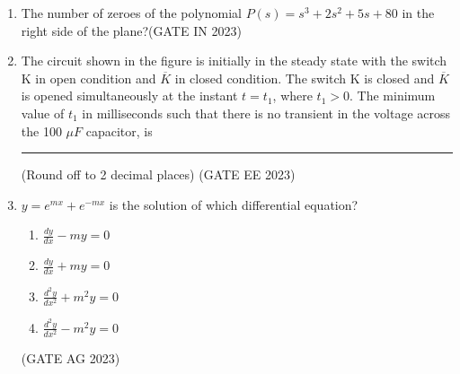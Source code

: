 \begin{enumerate}[label=\thechapter.\arabic*,ref=\thechapter.\theenumi]

\item The number of zeroes of the polynomial $P(s) = s^3+2s^2+5s+80$ in the right side of the plane?\hfill(GATE IN 2023) \\

\solution

\newpage

\item The circuit shown in the figure is initially in the steady state with the switch K in open condition and $\overline{K}$ in closed condition. The switch K is closed and $\overline{K}$ is opened simultaneously at the instant $t = t_1$, where $t_1 > 0$. The minimum value of $t_1$ in milliseconds such that there is no transient in the voltage across the 100 $\mu F$ capacitor, is \rule{1cm}{0.15mm} (Round off to 2 decimal places) \hfill (GATE EE 2023)


\newpage
\item $y=e^{mx}+e^{-mx}$ is the solution of which differential equation?
\begin{enumerate}[label=\textbf{\arabic*.}, font=\bfseries, align=left]
    \item $\frac{dy}{dx} - my = 0$ 
    \item $\frac{dy}{dx} + my = 0$ 
    \item $\frac{d^{2}y}{dx^{2}} + m^{2}y = 0$ 
    \item $\frac{d^{2}y}{dx^{2}} - m^{2}y = 0$ 
\end{enumerate} \hfill(GATE AG 2023)
\solution


\end{enumerate}
